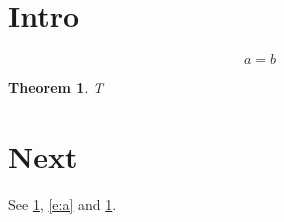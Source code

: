 \documentclass{article}
\newtheorem{theorem}{Theorem}
\begin{document}
\section{Intro}\label{s:a}
\begin{equation}a=b\label{e:a}\end{equation}
\begin{theorem}\label{t:a}T\end{theorem}
\section{Next}
See \cref{s:a}, \cref{e:a} and \cref{t:a}.
\end{document}
